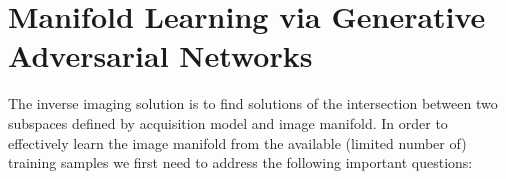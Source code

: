 \documentclass{journal}
\def \cN {\mathcal{N}}
\def \cS {\mathcal{S}}
\def \cM {\mathcal{M}}
\def \cP {\mathcal{P}}
\def \bPhi {\boldsymbol{\Phi}}
\def \by {\mathbf{y}}
\def \bx {\mathbf{x}}
\def \bz {\mathbf{z}}
\def \bI {\mathbf{I}}
\begin{document}
 
 
 
%










\section{Manifold Learning via Generative Adversarial Networks}
\label{sec:gans}
%
The inverse imaging solution is to find solutions of the intersection between two subspaces defined by acquisition model and image manifold. In order to effectively learn the image manifold from the available (limited number of) training samples we first need to address the following important questions:
\end{document}
